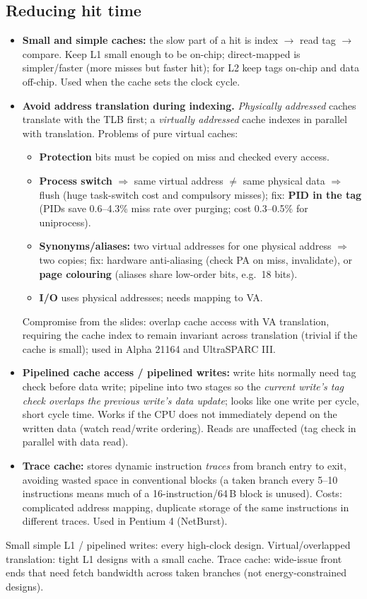 \subsection{Reducing hit time}
\begin{itemize}
\item \textbf{Small and simple caches:} the slow part of a hit is index $\rightarrow$ read tag $\rightarrow$ compare. Keep L1 small enough to be on-chip; direct-mapped is simpler/faster (more misses but faster hit); for L2 keep tags on-chip and data off-chip. Used when the cache sets the clock cycle.
\item \textbf{Avoid address translation during indexing.} \emph{Physically addressed} caches translate with the TLB first; a \emph{virtually addressed} cache indexes in parallel with translation. Problems of pure virtual caches:
 \begin{itemize}
 \item \textbf{Protection} bits must be copied on miss and checked every access.
 \item \textbf{Process switch} $\Rightarrow$ same virtual address $\neq$ same physical data $\Rightarrow$ flush (huge task-switch cost and compulsory misses); fix: \textbf{PID in the tag} (PIDs save 0.6--4.3\% miss rate over purging; cost 0.3--0.5\% for uniprocess).
 \item \textbf{Synonyms/aliases:} two virtual addresses for one physical address $\Rightarrow$ two copies; fix: hardware anti-aliasing (check PA on miss, invalidate), or \textbf{page colouring} (aliases share low-order bits, e.g.\ 18 bits).
 \item \textbf{I/O} uses physical addresses; needs mapping to VA.
 \end{itemize}
 Compromise from the slides: overlap cache access with VA translation, requiring the cache index to remain invariant across translation (trivial if the cache is small); used in Alpha 21164 and UltraSPARC III.
\item \textbf{Pipelined cache access / pipelined writes:} write hits normally need tag check before data write; pipeline into two stages so the \emph{current write's tag check overlaps the previous write's data update}; looks like one write per cycle, short cycle time. Works if the CPU does not immediately depend on the written data (watch read/write ordering). Reads are unaffected (tag check in parallel with data read).
\item \textbf{Trace cache:} stores dynamic instruction \emph{traces} from branch entry to exit, avoiding wasted space in conventional blocks (a taken branch every 5--10 instructions means much of a 16-instruction/64\,B block is unused). Costs: complicated address mapping, duplicate storage of the same instructions in different traces. Used in Pentium 4 (NetBurst).
\end{itemize}
\begin{pick}
Small simple L1 / pipelined writes: every high-clock design. Virtual/overlapped translation: tight L1 designs with a small cache. Trace cache: wide-issue front ends that need fetch bandwidth across taken branches (not energy-constrained designs).
\end{pick}

